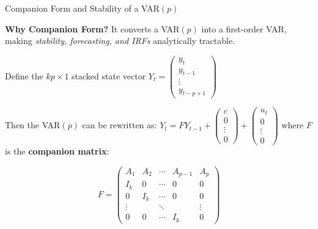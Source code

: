 \documentclass{beamer}
\begin{document}
\begin{frame}{Companion Form and Stability of a VAR$(p)$}
\small

\textbf{Why Companion Form?}  
It converts a VAR$(p)$ into a first-order VAR, making  
\emph{stability, forecasting, and IRFs} analytically tractable.

\medskip

Define the $kp \times 1$ stacked state vector $Y_t =
\begin{pmatrix}
y_t \\ y_{t-1} \\ \vdots \\ y_{t-p+1}
\end{pmatrix}$

Then the VAR$(p)$ can be rewritten as: $Y_t = 
F Y_{t-1} +
\begin{pmatrix}
c \\ 0 \\ \vdots \\ 0
\end{pmatrix}
+
\begin{pmatrix}
u_t \\ 0 \\ \vdots \\ 0
\end{pmatrix}$ 
where $F$ is the \textbf{companion matrix}:

\[
F =
\begin{pmatrix}
A_1 & A_2 & \cdots & A_{p-1} & A_p \\
I_k & 0   & \cdots & 0       & 0 \\
0   & I_k & \cdots & 0       & 0 \\
\vdots &   & \ddots &        & \vdots \\
0   & 0   & \cdots & I_k     & 0
\end{pmatrix}
\]

\end{frame}
\end{document}
